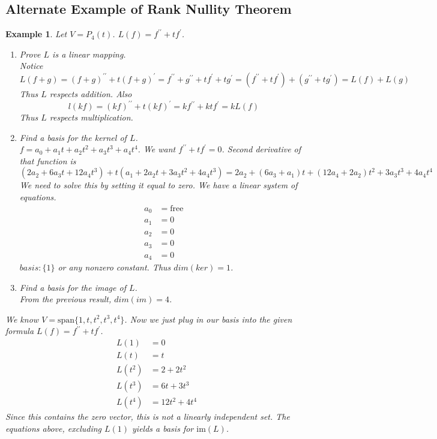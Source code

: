 \documentclass{report}
\newtheorem*{ex}{Example}
\begin{document}
\subsection{Alternate Example of Rank Nullity Theorem}
\begin{ex}
Let $V=P_4(t)$. $L(f)=f^{\prime\prime} + tf^\prime$.
\begin{enumerate}
\item[(a)] Prove $L$ is a linear mapping.\\
Notice 
\[ L(f+g) = (f+g)^{\prime\prime} + t(f+g)^\prime = f^{\prime\prime} + g^{\prime\prime} + tf^\prime + tg^\prime = (f^{\prime\prime}+tf^\prime)+(g^{\prime\prime}+tg^\prime) = L(f) + L(g) \] 
Thus $L$ respects addition. Also
\[ l(kf) = (kf)^{\prime\prime}+t(kf)^\prime = kf^{\prime\prime}+ktf^\prime = kL(f) \] 
Thus $L$ respects multiplication.
\item[(b)] Find a basis for the kernel of $L$.\\
$f=a_0+a_1t+a_2t^2+a_3t^3+a_4t^4$. We want $f^{\prime\prime}+tf^\prime = 0$. Second derivative of that function is
\[ (2a_2+6a_3t+12a_4t^3) + t(a_1+2a_2t+3a_3t^2+4a_4t^3) = 2a_2+(6a_3+a_1)t+(12a_4+2a_2)t^2+3a_3t^3+4a_4t^4 \]
We need to solve this by setting it equal to zero. We have a linear system of equations.\\
\begin{align*}
a_0&=\mathrm{free}\\
a_1&=0\\
a_2&=0\\
a_3&=0\\
a_4&=0
\end{align*}
$basis:\{1\}$ or any nonzero constant. Thus $dim(ker)=1$.
\item[(c)] Find a basis for the image of $L$.\\
From the previous result, $dim(im)=4$.
\end{enumerate}
We know $V=\mathrm{span}\{1,t,t^2,t^3,t^4\}$. Now we just plug in our basis into the given formula $L(f)=f^{\prime\prime}+tf^\prime$.
\begin{align*}
L(1)&=0\\
L(t)&=t\\
L(t^2)&=2+2t^2\\
L(t^3)&=6t+3t^3\\
L(t^4)&=12t^2+4t^4
\end{align*}
Since this contains the zero vector, this is not a linearly independent set. The equations above, excluding $L(1)$ yields a basis for $\mathrm{im}(L)$. 
\end{ex}
\end{document}
